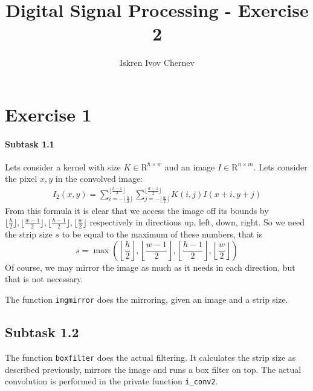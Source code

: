 \documentclass[a4paper]{article}
\begin{document}
\title{Digital Signal Processing - Exercise 2}
\author{Iskren Ivov Chernev}
\maketitle

\def\sm{\mathrm{sm}}
\def\P{\mathbb{P}}
\def\E{\mathbb{E}}
\def\irv{i.r.v.\;}
\def\rv{r.v.\;}
\def\FMM{F.M.M.\;}
\def\endproof{$\square$}
\def\Var{\mathrm{Var}}
\def\Cov{\mathrm{Cov}}
\def\CS{\mathrm{CS}}
\def\CCS{\mathrm{CCS}}
\def\R{\mathrm{R}}
\newcommand{\FL}[1] {\left\lfloor #1 \right\rfloor}
\newcommand{\bfrac}[2] {\left(\frac{#1}{#2}\right)}
\newcommand{\B}[1] {\left(#1\right)}

\section*{Exercise 1}

\paragraph*{Subtask 1.1}
Lets consider a kernel with size $ K \in \R^{h\times{}w} $ and an image $ I \in
\R^{n\times{}m} $. Lets consider the pixel $ x, y $ in the convolved image:
\begin{eqnarray*}
  I_2(x, y) = \sum_{i = -\lfloor \frac{h}{2} \rfloor}^{\lfloor \frac{h-1}{2} \rfloor}
              \sum_{j = -\lfloor \frac{w}{2} \rfloor}^{\lfloor \frac{w-1}{2} \rfloor}
                K(i, j) I(x + i, y + j)
\end{eqnarray*}
From this formula it is clear that we access the image off its bounds by
$ \lfloor \frac{h}{2} \rfloor, \lfloor \frac{w-1}{2} \rfloor, \lfloor
\frac{h-1}{2} \rfloor, \lfloor \frac{w}{2} \rfloor $ respectively in directions
up, left, down, right. So we need the strip size $ s $ to be equal to the maximum of these numbers, that is
$$
  s = \max\B{\FL{\frac{h}{2}}, \FL{\frac{w-1}{2}}, \FL{\frac{h-1}{2}}, \FL{\frac{w}{2}}}
$$
Of course, we may mirror the image as much as it needs in each direction, but
that is not necessary.

The function \texttt{imgmirror} does the mirroring, given an image and a strip size.

\subsection*{Subtask 1.2}

The function \texttt{boxfilter} does the actual filtering. It calculates the strip size as described previously, mirrors the image and runs a box filter on top. The actual convolution is performed in the private function \texttt{i\_conv2}.
\end{document}
